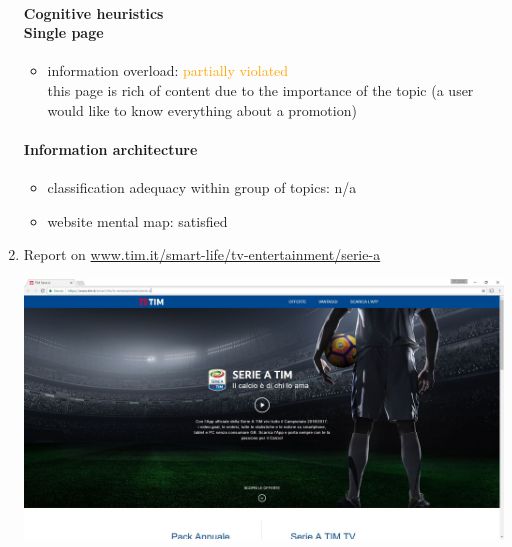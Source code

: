 \begin{enumerate}
	\paragraph*{Cognitive heuristics \\ Single page}
	\begin{itemize}
		\item information overload: \textcolor{orange}{partially violated}\\
		this page is rich of content due to the importance of the topic (a user would like to know everything about a promotion)
	\end{itemize}	
	
	\paragraph*{Information architecture}
	\begin{itemize}
		\item classification adequacy within group of topics: n/a
		\item website mental map: satisfied
	\end{itemize}

\newpage


\item Report on \url{www.tim.it/smart-life/tv-entertainment/serie-a}

\begin{center}
	\includegraphics[width=\textwidth]{Screenshot/seriea.jpg}
\end{center}
\vspace{1cm}


\end{enumerate}
